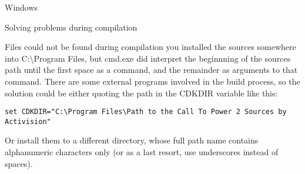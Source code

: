 \begin{section}{Windows}
\begin{subsection}{Solving problems during compilation}
\begin{subsubsection}{Files could not be found during compilation}
you installed the sources somewhere into C:\textbackslash{}Program Files, but cmd.exe did interpret the beginnning of the sources path until the first space as a command, and the remainder as arguments to that command. There are some external programs involved in the build process, so the solution could be either quoting the path in the CDKDIR variable like this:
\begin{verbatim}
set CDKDIR="C:\Program Files\Path to the Call To Power 2 Sources by Activision"
\end{verbatim}

Or install them to a different directory, whose full path name contains alphanumeric characters only (or as a last resort, use underscores instead of spaces).

\end{subsubsection}%

\end{subsection}%

\end{section}%
